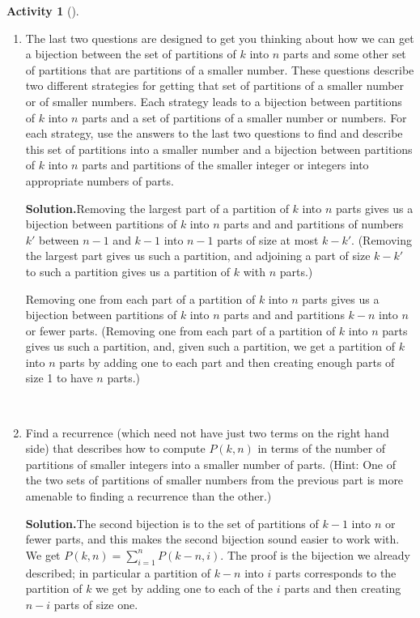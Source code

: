 \documentclass[10pt,]{book}
\theoremstyle{plain}
\theoremstyle{definition}
\newtheorem{activity}[project]{Activity}
\numberwithin{equation}{chapter}
\begin{document}
\begin{activity}[]
\begin{enumerate}[label=(\alph*)]
~\par
\item The last two questions are designed to get you thinking about how we can get a bijection between the set of  partitions of \(k\) into \(n\) parts and some other set of partitions that are partitions of a smaller number.  These questions describe two different strategies for getting that set of partitions of a smaller number or of smaller numbers. Each strategy leads to a bijection between partitions of \(k\) into \(n\) parts and a set of partitions of a smaller number or numbers.  For each strategy, use the answers to the last two questions to find and describe this set of partitions into a smaller number and a bijection between partitions of \(k\) into \(n\) parts and partitions of the smaller integer or integers into appropriate numbers of parts.%
\par\medskip\noindent%
\textbf{Solution.}\quad Removing the largest part of a partition of \(k\) into \(n\) parts gives us a bijection between partitions of \(k\) into \(n\) parts and and partitions of numbers \(k'\) between \(n-1\) and \(k-1\) into \(n-1\) parts of size at most \(k-k'\). (Removing the largest part gives us such a partition, and adjoining a part of size \(k-k'\) to such a partition gives us a partition of \(k\) with \(n\) parts.)%
\par
Removing one from each part of a partition of \(k\) into \(n\) parts gives us a bijection between partitions of \(k\) into \(n\) parts and and partitions \(k-n\) into \(n\) or fewer parts. (Removing one from each part of a partition of \(k\) into \(n\) parts gives us such a partition, and, given such a partition, we get a partition of \(k\) into \(n\) parts by adding one to each part and then creating enough parts of size 1 to have \(n\) parts.)%

~\par
\item Find a recurrence (which need not have just two terms on the right hand side) that describes how to compute \(P(k,n)\) in terms of the number of partitions of smaller integers into a smaller number of parts. (Hint: One of the two sets of partitions of smaller numbers from the previous part is more amenable to finding a recurrence than the other.)%
\par\medskip\noindent%
\textbf{Solution.}\quad The second bijection is to the set of partitions of \(k-1\) into \(n\) or fewer parts, and this makes the second bijection sound easier to work with. We get \(P(k,n)=\sum_{i=1}^n P(k-n,i)\). The proof is the bijection we already described; in particular a partition of \(k-n\) into \(i\) parts corresponds to the partition of \(k\) we get by adding one to each of the \(i\) parts and then creating \(n-i\) parts of size one.%


\end{enumerate}
\end{activity}
\end{document}

